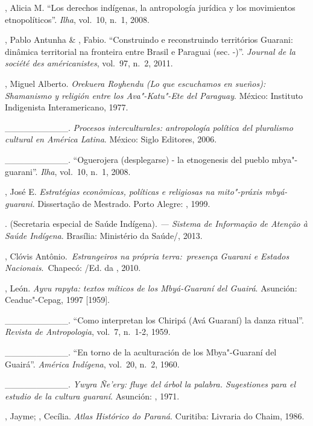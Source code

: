 \begin{Parskip}
, Alicia M. ``Los derechos indígenas, la antropología jurídica y
los movimientos etnopolíticos''. \emph{Ilha}, vol.~10, n.~1, 2008.

, Pablo Antunha \& , Fabio. ``Construindo e reconstruindo
territórios Guarani: dinâmica territorial na fronteira entre Brasil e
Paraguai (sec. -)''. \emph{Journal de la société des américanistes}, vol.~97, n.~2,
2011. 

, Miguel Alberto. \emph{Orekuera Royhendu (Lo que escuchamos en
sueños): Shamanismo y religión entre los Ava"-Katu"-Ete del Paraguay}.
México: Instituto Indigenista Interamericano, 1977.

\_\_\_\_\_\_\_\_\_\_. \emph{Procesos interculturales: antropología política
del pluralismo cultural en América Latina}. México: Siglo  Editores,
2006.

\_\_\_\_\_\_\_\_\_\_. ``Oguerojera (desplegarse) - la etnogenesis del
pueblo mbya"-guarani''. \emph{Ilha}, vol.~10, n.~1, 2008.

 , José E. \emph{Estratégias econômicas, políticas e religiosas
na mito"-práxis mbyá-guarani}. Dissertação de Mestrado. Porto Alegre:
, 1999.

.  (Secretaria especial de Saúde Indígena). \emph{ — Sistema
de Informação de Atenção à Saúde Indígena}. Brasília: Ministério da
Saúde/, 2013.

, Clóvis Antônio.\emph{~Estrangeiros na própria terra:~presença
Guarani e Estados Nacionais}.~Chapecó: /Ed. da , 2010. 

, León. \emph{Ayvu rapyta: textos míticos de los Mbyá-Guaraní del
Guairá}. Asunción: Ceaduc"-Cepag, 1997 [1959].

\_\_\_\_\_\_\_\_\_\_. ``Como interpretan los Chiripá (Avá Guaraní) la
danza ritual''. \emph{Revista de Antropologia}, vol.~7, n.~1-2, 1959.

\_\_\_\_\_\_\_\_\_\_. ``En torno de la aculturación de los Mbya"-Guaraní
del Guairá''. \emph{América Indígena}, vol.~20, n.~2, 1960. 

\_\_\_\_\_\_\_\_\_\_. \emph{Ywyra Ñe’ery: fluye del árbol la palabra.
Sugestiones para el estudio de la cultura guaraní}. Asunción: ,
1971.

, Jayme; , Cecília. \emph{Atlas Histórico do Paraná}.
Curitiba: Livraria do Chaim, 1986.


\end{Parskip}
